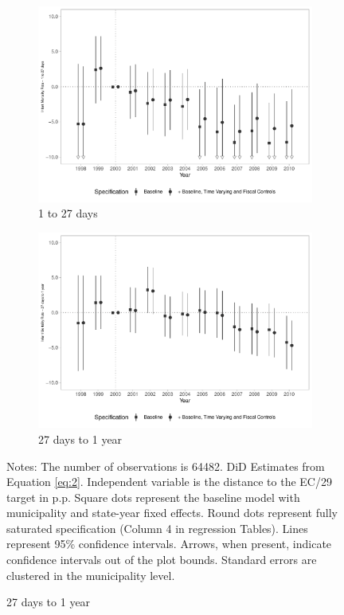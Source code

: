 \begin{figure}[h!]
\begin{center}
    \begin{subfigure}{0.48\textwidth}
        \centering
        \caption{\scriptsize 1 to 27 days}\label{fig:16c}
        \includegraphics[width=\textwidth]{plots/tx_mi_27d_dist_ec29_baseline_dist_ec29_baseline_16.pdf}
    \end{subfigure}
    \begin{subfigure}{0.48\textwidth}
        \centering
        \caption{\scriptsize 27 days to 1 year}\label{fig:16d}
        \includegraphics[width=\textwidth]{plots/tx_mi_ano_dist_ec29_baseline_dist_ec29_baseline_16.pdf}
    \end{subfigure}
    
    \end{center}
    
            \scriptsize{Notes: The number of observations is 64482. DiD Estimates from Equation \ref{eq:2}. Independent variable is the distance to the EC/29 target in p.p. Square dots represent the baseline model with municipality and state-year fixed effects. Round dots represent fully saturated specification (Column 4 in regression Tables). Lines represent 95\% confidence intervals. Arrows, when present, indicate confidence intervals out of the plot bounds. Standard errors are clustered in the municipality level.}
    
\end{figure}
